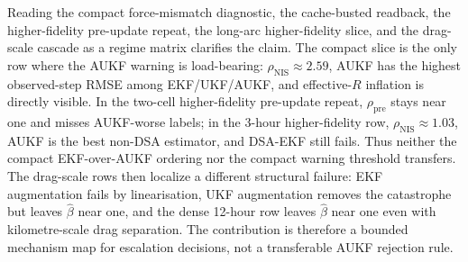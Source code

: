 \documentclass{article}
\begin{document}
Reading the compact force-mismatch diagnostic, the cache-busted readback, the higher-fidelity pre-update repeat, the long-arc higher-fidelity slice, and the drag-scale cascade as a regime matrix clarifies the claim. The compact slice is the only row where the AUKF warning is load-bearing: \(\rho_{\mathrm{NIS}}\approx2.59\), AUKF has the highest observed-step RMSE among EKF/UKF/AUKF, and effective-\(R\) inflation is directly visible. In the two-cell higher-fidelity pre-update repeat, \(\rho_{\mathrm{pre}}\) stays near one and misses AUKF-worse labels; in the 3-hour higher-fidelity row, \(\rho_{\mathrm{NIS}}\approx1.03\), AUKF is the best non-DSA estimator, and DSA-EKF still fails. Thus neither the compact EKF-over-AUKF ordering nor the compact warning threshold transfers. The drag-scale rows then localize a different structural failure: EKF augmentation fails by linearisation, UKF augmentation removes the catastrophe but leaves \(\hat\beta\) near one, and the dense 12-hour row leaves \(\hat\beta\) near one even with kilometre-scale drag separation. The contribution is therefore a bounded mechanism map for escalation decisions, not a transferable AUKF rejection rule.
\end{document}
